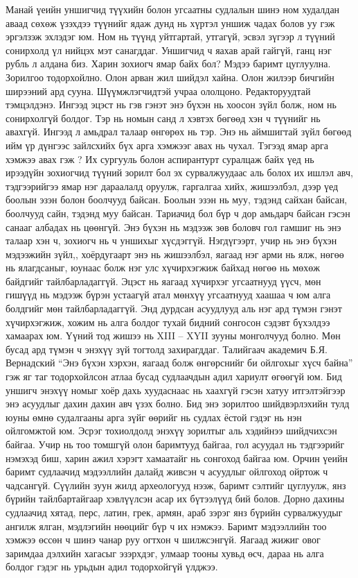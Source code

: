Манай үеийн уншигчид түүхийн болон угсаатны судлалын шинэ ном худалдан аваад сөхөж үзэхдээ түүнийг ядаж дунд нь хүртэл уншиж чадах болов уу гэж эргэлзэж эхлэдэг юм. Ном нь түүнд уйтгартай, утгагүй, эсвэл зүгээр л түүний сонирхолд үл нийцэх мэт санагддаг. Уншигчид ч яахав арай гайгүй, ганц нэг рубль л алдана биз. Харин зохиогч ямар байх бол? Мэдээ баримт цуглуулна. Зорилгоо тодорхойлно. Олон арван жил шийдэл хайна. Олон жилээр бичгийн ширээний ард сууна. Шүүмжлэгчидтэй учраа ололцоно. Редакторуудтай тэмцэлдэнэ. Ингээд эцэст нь гэв гэнэт энэ бүхэн нь хоосон зүйл болж, ном нь сонирхолгүй болдог. Тэр нь номын санд л хэвтэх бөгөөд хэн ч түүнийг нь авахгүй. Ингээд л амьдрал талаар өнгөрөх нь тэр.
Энэ нь аймшигтай зүйл бөгөөд ийм үр дүнгээс зайлсхийх бүх арга хэмжээг авах нь чухал. Тэгээд ямар арга хэмжээ авах гэж ? Их сургууль болон аспирантурт суралцаж байх үед нь ирээдүйн зохиогчид түүний зорилт бол эх сурвалжуудаас аль болох их ишлэл авч, тэдгээрийгээ ямар нэг дараалалд оруулж, гаргалгаа хийх, жишээлбэл, дээр үед боолын эзэн болон боолчууд байсан. Боолын эзэн нь муу, тэдэнд сайхан байсан, боолчууд сайн, тэдэнд муу байсан. Тариачид бол бүр ч дор амьдарч байсан гэсэн санааг албадах нь цөөнгүй.
Энэ бүхэн нь мэдээж зөв боловч гол гамшиг нь энэ талаар хэн ч, зохиогч нь ч уншихыг хүсдэггүй. Нэгдүгээрт, учир нь энэ бүхэн мэдээжийн зүйл,, хоёрдугаарт энэ нь жишээлбэл, яагаад нэг арми нь ялж, нөгөө нь ялагдсаныг, юунаас болж нэг улс хүчирхэгжиж байхад нөгөө нь мөхөж байдгийг тайлбарладаггүй. Эцэст нь яагаад хүчирхэг угсаатнууд үүсч, мөн гишүүд нь мэдээж бүрэн устаагүй атал мөнхүү угсаатнууд хаашаа ч юм алга болдгийг мөн тайлбарладаггүй.
Энд дурдсан асуудлууд аль нэг ард түмэн гэнэт хүчирхэгжиж, хожим нь алга болдог тухай бидний сонгосон сэдэвт бүхэлдээ хамаарах юм. Үүний тод жишээ нь XIII – XYII зууны монголчууд болно. Мөн бусад ард түмэн ч энэхүү зүй тогтолд захирагддаг. Талийгаач академич Б.Я. Вернадский “Энэ бүхэн хэрхэн, яагаад болж өнгөрснийг би ойлгохыг хүсч байна” гэж яг таг тодорхойлсон атлаа бусад судлаачдын адил хариулт өгөөгүй юм. Бид уншигч энэхүү номыг хоёр дахь хуудаснаас нь хаахгүй гэсэн хатуу итгэлтэйгээр энэ асуудлыг дахин дахин авч үзэх болно.
Бид энэ зорилтоо шийдвэрлэхийн тулд юуны өмнө судалгааны арга зүйг өөрийг нь судлах ёстой гэдэг нь нэн ойлгомжтой юм. Эсрэг тохиолдолд энэхүү зорилтыг аль хэдийнээ шийдчихсэн байгаа. Учир нь тоо томшгүй олон баримтууд байгаа, гол асуудал нь тэдгээрийг нэмэхэд биш, харин ажил хэрэгт хамаатайг нь сонгоход байгаа юм. Орчин үеийн баримт судлаачид мэдээллийн далайд живсэн ч асуудлыг ойлгоход ойртож ч чадсангүй. Сүүлийн зуун жилд археологууд нээж, баримт сэлтийг цуглуулж, янз бүрийн тайлбартайгаар хэвлүүлсэн асар их бүтээлүүд бий болов. Дорно дахины судлаачид хятад, перс, латин, грек, армян, араб зэрэг янз бүрийн сурвалжуудыг ангилж ялган, мэдлэгийн нөөцийг бүр ч их нэмжээ. Баримт мэдээллийн тоо хэмжээ өссөн ч шинэ чанар руу огтхон ч шилжсэнгүй. Яагаад жижиг овог заримдаа дэлхийн хагасыг эзэрхдэг, улмаар тооны хувьд өсч, дараа нь алга болдог гэдэг нь урьдын адил тодорхойгүй үлджээ.
